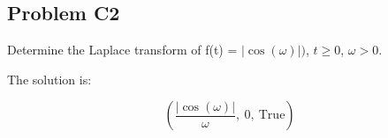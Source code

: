 \subsection*{Problem C2} Determine the Laplace transform of f(t) = \(\left|{\cos{\left(\omega \right)}}\right|)\), \(t \geq 0\), \(\omega > 0\).

    \medskip
    The solution is:

    \smallskip
     \begin{equation}
         \left( \frac{\left|{\cos{\left(\omega \right)}}\right|}{\omega}, \  0, \  \text{True}\right)
     \end{equation}
